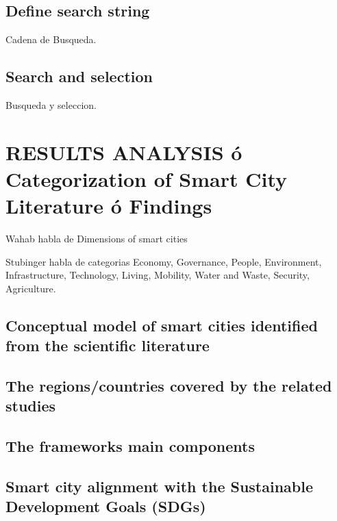 \documentclass[a4paper,fleqn,spanish]{cas-dc}
\begin{document}
\subsection{Define search string}\label{cadena}

Cadena de Busqueda.


\subsection{Search and selection}\label{seleccion}

Busqueda y seleccion.


\section{RESULTS ANALYSIS ó Categorization of Smart City Literature ó Findings}\label{resultados}

Wahab habla de Dimensions of smart cities \cite{wahab_systematic_2020}

Stubinger habla de categorias \cite{stubinger_understanding_2020}
Economy,
Governance,
People,
Environment,
Infrastructure,
Technology,
Living,
Mobility,
Water and Waste,
Security, 
Agriculture.


\subsection{Conceptual model of smart cities  identified from the scientific literature}\label{sci-lit}


\subsection{The regions/countries covered by the related studies}\label{regiones}



\subsection{The frameworks main components}\label{componentes}



\subsection{Smart city alignment with the Sustainable Development Goals (SDGs)}\label{sustentabilidad}

\end{document}
